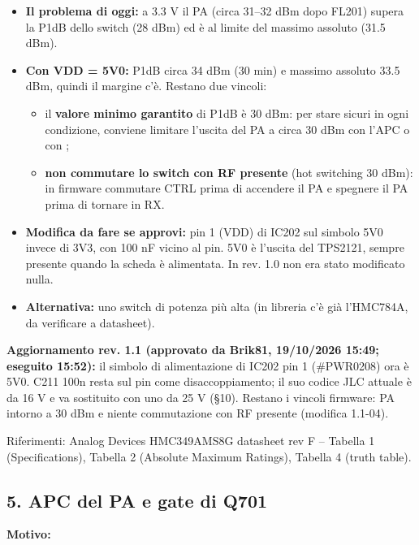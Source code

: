 \begin{itemize}
\item \textbf{Il problema di oggi:} a 3.3 V il PA (circa 31–32 dBm dopo FL201) supera la P1dB dello switch (28 dBm) ed è al limite del massimo assoluto (31.5 dBm).
\item \textbf{Con VDD = 5V0:} P1dB circa 34 dBm (30 min) e massimo assoluto 33.5 dBm, quindi il margine c'è. Restano due vincoli:
\begin{itemize}
\item il \textbf{valore minimo garantito} di P1dB è 30 dBm: per stare sicuri in ogni condizione, conviene limitare l'uscita del PA a circa 30 dBm con l'APC o con ;
\item \textbf{non commutare lo switch con RF presente} (hot switching 30 dBm): in firmware commutare CTRL prima di accendere il PA e spegnere il PA prima di tornare in RX.
\end{itemize}
\item \textbf{Modifica da fare se approvi:} pin 1 (VDD) di IC202 sul simbolo 5V0 invece di 3V3, con 100 nF vicino al pin. 5V0 è l'uscita del TPS2121, sempre presente quando la scheda è alimentata. In rev. 1.0 non era stato modificato nulla.
\item \textbf{Alternativa:} uno switch di potenza più alta (in libreria c'è già l'HMC784A, da verificare a datasheet).
\end{itemize}

\begin{okbox}
\textbf{Aggiornamento rev. 1.1 (approvato da Brik81, 19/\allowbreak{}10/\allowbreak{}2026 15:49; eseguito 15:52):} il simbolo di alimentazione di IC202 pin 1 (\#PWR0208) ora è 5V0. C211 100n resta sul pin come disaccoppiamento; il suo codice JLC attuale è da 16 V e va sostituito con uno da 25 V (§10). Restano i vincoli firmware: PA intorno a 30 dBm e niente commutazione con RF presente (modifica 1.1-04).
\end{okbox}

{\small Riferimenti: Analog Devices HMC349AMS8G datasheet rev F – Tabella 1 (Specifications), Tabella 2 (Absolute Maximum Ratings), Tabella 4 (truth table).}

\subsection[5. APC del PA e gate di Q701]{5. APC del PA e gate di Q701 }

\textbf{Motivo:}

